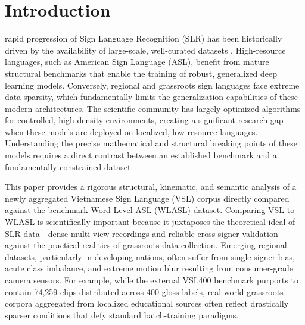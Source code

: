 \documentclass{ieeeaccess}
\begin{document}
\section{Introduction}
\label{sec:introduction}
 rapid progression of Sign Language Recognition (SLR) has been historically driven by the availability of large-scale, well-curated datasets \cite{b1}. High-resource languages, such as American Sign Language (ASL), benefit from mature structural benchmarks that enable the training of robust, generalized deep learning models. Conversely, regional and grassroots sign languages face extreme data sparsity, which fundamentally limits the generalization capabilities of these modern architectures. The scientific community has largely optimized algorithms for controlled, high-density environments, creating a significant research gap when these models are deployed on localized, low-resource languages. Understanding the precise mathematical and structural breaking points of these models requires a direct contrast between an established benchmark and a fundamentally constrained dataset.

This paper provides a rigorous structural, kinematic, and semantic analysis of a newly aggregated Vietnamese Sign Language (VSL) corpus directly compared against the benchmark Word-Level ASL (WLASL) dataset. Comparing VSL to WLASL is scientifically important because it juxtaposes the theoretical ideal of SLR data—dense multi-view recordings and reliable cross-signer validation \cite{b1}—against the practical realities of grassroots data collection. Emerging regional datasets, particularly in developing nations, often suffer from single-signer bias, acute class imbalance, and extreme motion blur resulting from consumer-grade camera sensors. For example, while the external VSL400 benchmark purports to contain 74,259 clips distributed across 400 gloss labels, real-world grassroots corpora aggregated from localized educational sources often reflect drastically sparser conditions that defy standard batch-training paradigms.
\end{document}
